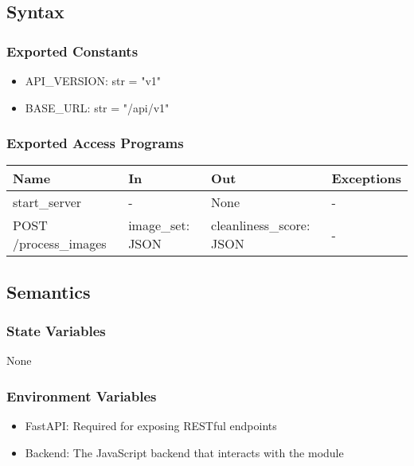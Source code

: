 \documentclass[12pt, titlepage]{article}
\begin{document}
\subsection{Syntax}

\subsubsection{Exported Constants}

\begin{itemize}
  \item API{\_}VERSION: str = "v1"
  \item BASE{\_}URL: str = "/api/v1"
\end{itemize}

\subsubsection{Exported Access Programs}

\begin{center}
\begin{tabular}{p{5cm} p{3cm} p{3cm} p{2cm}}
\hline
\textbf{Name} & \textbf{In} & \textbf{Out} & \textbf{Exceptions} \\
\hline
start{\_}server & - & None & - \\
\hline
POST /process{\_}images & image{\_}set: JSON & cleanliness{\_}score: JSON & - \\
\hline
\end{tabular}
\end{center}

\subsection{Semantics}

\subsubsection{State Variables}
None


\subsubsection{Environment Variables}
\begin{itemize}
  \item FastAPI: Required for exposing RESTful endpoints
  \item Backend: The JavaScript backend that interacts with the module
\end{itemize}
\end{document}
